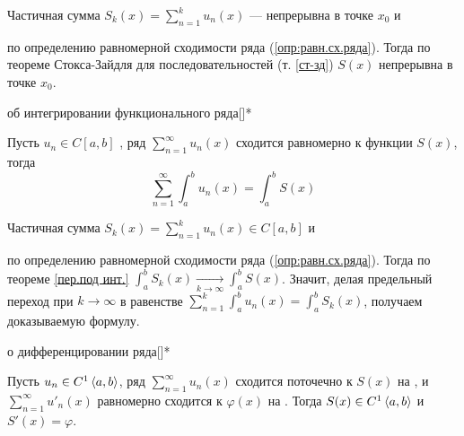 \begin{prf} %
	Частичная сумма $S_k(x) = \sum\limits_{n = 1}^{k}u_n(x)$ --- непрерывна в точке $x_0$ и\! по определению равномерной сходимости ряда (\ref{опр:равн.сх.ряда}). Тогда по теореме Стокса-Зайдля для последовательностей (т. \ref{ст-зд}) $S(x)$ непрерывна в точке $x_0$. 
\end{prf} %

\begin{teor}[https://www.youtube.com/live/g4Zgeu8xe-Q?si=GEu4QG3yGOvet_UK&t=10772]{об интегрировании функционального ряда}[]*%
	\addtocounter{nteor}{-3}%
	\addtocounter{nteor}{3}%
	Пусть $u_n \in C[a, b]$ , ряд $\sum\limits_{n = 1}^{\infty}u_n(x)$ сходится равномерно к функции $S(x)$, тогда \[\sum_{n = 1}^{\infty} \int_a^b u_n(x) = \int_a^b S(x)\]
\end{teor} %

\begin{prf} %
		Частичная сумма $S_k(x) = \sum\limits_{n = 1}^{k}u_n(x) \in C[a, b]$ и\!
		по определению равномерной сходимости ряда (\ref{опр:равн.сх.ряда}). Тогда по теореме \ref{пер.под инт.} $\int_a^b S_k(x) \xrightarrow[k \to \infty]{} \int_a^b S(x)$. 
		Значит, делая предельный переход при $k \to \infty$ в равенстве $\sum\limits_{n = 1}^{k}\int_a^b u_n(x) = \int_a^b S_k(x)$, получаем доказываемую формулу. 
\end{prf} %

\begin{teor}[https://www.youtube.com/live/g4Zgeu8xe-Q?si=VKzpWKydqsZrl_u4&t=12003]{о дифференцировании ряда}[]*\label{дифф.ряда}%
	\addtocounter{nteor}{-1}%
	\addtocounter{nteor}{1}%
	Пусть $u_n\in C^1 \left<a, b\right>$, ряд $\sum\limits_{n = 1}^{\infty} u_n(x)$ сходится поточечно к $S(x)$ на , и $\sum\limits_{n = 1}^{\infty} u'_n(x)$ равномерно сходится к $\varphi(x)$ на . Тогда $S(x) \in C^1\left<a,b\right>$ и $S'(x) = \varphi$.
\end{teor} %

